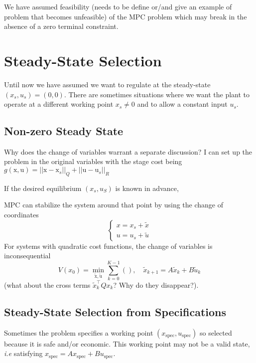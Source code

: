 \documentclass[11pt]{report}
\newcommand{\bs}[1]{\boldsymbol{#1}}
\newcommand{\bsu}{\bs{\mathrm{u}}}
\newcommand{\bsx}{\bs{\mathrm{x}}}
\begin{document}
We have assumed feasibility (needs to be define or/and give an example of problem that becomes unfeasible) of the MPC problem which may break in the absence of a zero terminal constraint.

\section{Steady-State Selection}
\label{sec:steady-state-selection}

Until now we have assumed we want to regulate at the steady-state $(x_s,u_s) = (0,0)$. There are sometimes situations where we want the plant to operate at a different working point $x_s\neq 0$ and to allow a constant input $u_s$.

\subsection{Non-zero Steady State}
\label{sec:nonzero-steady-state}

Why does the change of variables warrant a separate discussion? I can set up the problem in the original variables with the stage cost being $g(\bsx,\bsu) = ||\bsx-\bsx_s||_Q + ||\bsu-\bsu_s||_R$

If the desired equilibrium $(x_s,u_S)$ is known in advance,

MPC can stabilize the system around that point by using the change of coordinates
\begin{equation*}
  \begin{cases}
    x = x_s + \tilde{x} \\
    u = u_s + \tilde{u}
  \end{cases}
\end{equation*}
For systems with quadratic cost functions, the change of variables is inconsequential
\begin{equation*}
  V(x_0) = \min_{\tilde{\bsx},\tilde{\bsu}} \sum_{k=0}^{K-1} \left(\right),\quad \tilde{x}_{k+1} = A\tilde{x}_k + B\tilde{u}_k
\end{equation*}
(what about the cross terms $\tilde{x}_k^\top Qx_k$? Why do they disappear?).

\subsection{Steady-State Selection from Specifications}
\label{sec:steady-state-from-specs}

Sometimes the problem specifies a working point $(x_\text{spec},u_\text{spec})$ so selected because it is safe and/or economic. This working point may not be a valid state, \textit{i.e} satisfying $x_\text{spec} = Ax_\text{spec}+Bu_\text{spec}$.
\end{document}
